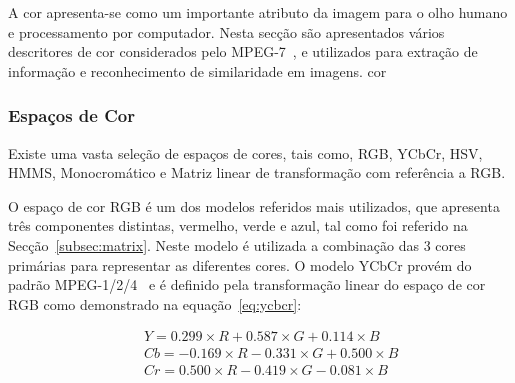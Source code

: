 A cor apresenta-se como um importante atributo da imagem para o olho humano e processamento por computador. Nesta secção são apresentados vários descritores de cor considerados pelo MPEG-7~\cite{Manjunath2001, Christopoulos2000, Cieplinski2001, Ite-vil}, e utilizados para extração de informação e reconhecimento de similaridade em imagens.  cor 


\subsubsection{Espaços de Cor} \label{subsubsec:space}

Existe uma vasta seleção de espaços de cores, tais como, RGB, YCbCr, HSV, HMMS, Monocromático e Matriz linear de transformação com referência a RGB. %


O espaço de cor RGB é um dos modelos referidos mais utilizados, que apresenta três componentes distintas, vermelho, verde e azul, tal como foi referido na Secção~\ref{subsec:matrix}. Neste modelo é utilizada a combinação das 3 cores primárias para representar as diferentes cores. O modelo YCbCr provém do padrão MPEG-1/2/4~\cite{Ite-vil} e é definido pela transformação linear do espaço de cor RGB como demonstrado na equação~\ref{eq:ycbcr}:

\begin{eqnarray}
&& Y = 0.299\times R + 0.587\times G + 0.114\times B\nonumber\\
&& Cb = -0.169\times R - 0.331\times G + 0.500\times B \nonumber\\
&& Cr = 0.500\times R - 0.419\times G - 0.081\times B \label{eq:ycbcr}
\end{eqnarray} 

